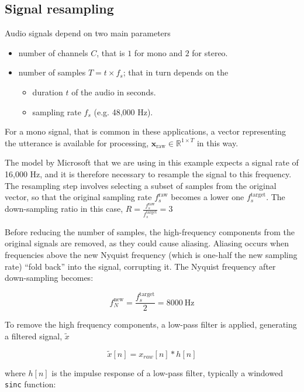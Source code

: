 \documentclass[conference]{IEEEtran}
\begin{document}
\subsection{Signal resampling}
\label{ssec:signal-resampling}

Audio signals depend on two main parameters

\begin{itemize}
	\item number of channels $C$, that is $1$ for mono and $2$ for stereo.
	\item number of samples $T = t \times f_s$; that in turn depends on the
	\begin{itemize}
		\item duration $t$ of the audio in seconds.
		\item sampling rate $f_s$ (e.g. 48,000 Hz).
	\end{itemize}
	
\end{itemize}

For a mono signal, that is common in these applications, a vector representing the utterance is available for processing,  $\mathbf{x}_{\text{raw}} \in \mathbb{R}^{1 \times T}$ in this way.


The model by Microsoft that we are using in this example expects a signal rate of 16,000 Hz, and it is therefore necessary to resample the signal to this frequency. The resampling step involves selecting a subset of samples from the original vector, so that the original sampling rate $f_s^{\text{raw}}$ becomes a lower one $f_s^{\text{target}}$. The down-sampling ratio in this case, $R = \frac{f_s^{\text{raw}}}{f_s^{\text{target}}} = 3$


Before reducing the number of samples, the high-frequency components from the original signals are removed, as they could cause aliasing. Aliasing occurs when frequencies above the new Nyquist frequency (which is one-half the new sampling rate) “fold back” into the signal, corrupting it. The Nyquist frequency after down-sampling becomes:

$$f_N^{\text{new}} = \frac{f_s^{\text{target}}}{2} = 8000~\text{Hz}$$

To remove the high frequency components, a low-pass filter is applied, generating a filtered signal, $\tilde{x}$

$$\tilde{x}[n] = x_{raw}[n] * h[n]$$

where $h[n]$ is the impulse response of a low-pass filter, typically a windowed \texttt{sinc} function:
\end{document}
